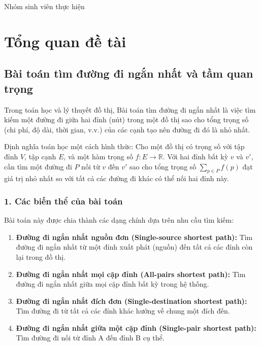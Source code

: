 \documentclass[12pt,a4paper,oneside]{report}
\begin{document}
\vspace{1cm}
\hfill Nhóm sinh viên thực hiện

\chapter{Tổng quan đề tài}

\section{Bài toán tìm đường đi ngắn nhất và tầm quan trọng}
Trong toán học và lý thuyết đồ thị, Bài toán tìm đường đi ngắn nhất là việc tìm kiếm một đường đi giữa hai đỉnh (nút) trong một đồ thị sao cho tổng trọng số (chi phí, độ dài, thời gian, v.v.) của các cạnh tạo nên đường đi đó là nhỏ nhất.

Định nghĩa toán học một cách hình thức: Cho một đồ thị có trọng số với tập đỉnh $V$, tập cạnh $E$, và một hàm trọng số $f: E \to \mathbb{R}$. Với hai đỉnh bất kỳ $v$ và $v'$, cần tìm một đường đi $P$ nối từ $v$ đến $v'$ sao cho tổng trọng số $\sum_{p \in P}f(p)$ đạt giá trị nhỏ nhất so với tất cả các đường đi khác có thể nối hai đỉnh này.

\subsection*{1. Các biến thể của bài toán}
Bài toán này được chia thành các dạng chính dựa trên nhu cầu tìm kiếm:

\begin{enumerate}
    \item \textbf{Đường đi ngắn nhất nguồn đơn (Single-source shortest path):} Tìm đường đi ngắn nhất từ một đỉnh xuất phát (nguồn) đến tất cả các đỉnh còn lại trong đồ thị.
    \item \textbf{Đường đi ngắn nhất mọi cặp đỉnh (All-pairs shortest path):} Tìm đường đi ngắn nhất giữa mọi cặp đỉnh bất kỳ trong hệ thống.
    \item \textbf{Đường đi ngắn nhất đích đơn (Single-destination shortest path):} Tìm đường đi từ tất cả các đỉnh khác hướng về chung một đích đến.
    \item \textbf{Đường đi ngắn nhất giữa một cặp đỉnh (Single-pair shortest path):} Tìm đường đi nối từ đỉnh A đến đỉnh B cụ thể.
\end{enumerate}
\end{document}
